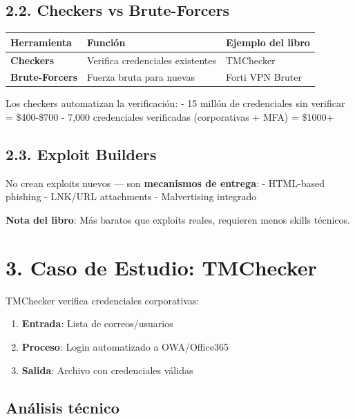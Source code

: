 \documentclass[
  letterpaper,
]{report}
\newcounter{none} %
\providecommand{\tightlist}{%
  \setlength{\itemsep}{0pt}\setlength{\parskip}{0pt}}
\begin{document}
\subsection{2.2. Checkers vs
Brute-Forcers}\label{checkers-vs-brute-forcers}

{\def\LTcaptype{none} %
\begin{longtable}[]{@{}lll@{}}
\toprule\noalign{}
Herramienta & Función & Ejemplo del libro \\
\midrule\noalign{}
\endhead
\bottomrule\noalign{}
\endlastfoot
\textbf{Checkers} & Verifica credenciales existentes & TMChecker \\
\textbf{Brute-Forcers} & Fuerza bruta para nuevas & Forti VPN Bruter \\
\end{longtable}
}

Los checkers automatizan la verificación: - 15 millón de credenciales
sin verificar = \$400-\$700 - 7,000 credenciales verificadas
(corporativas + MFA) = \$1000+

\subsection{2.3. Exploit Builders}\label{exploit-builders}

No crean exploits nuevos --- son \textbf{mecanismos de entrega}: -
HTML-based phishing - LNK/URL attachments - Malvertising integrado

\textbf{Nota del libro}: Más baratos que exploits reales, requieren
menos skills técnicos.

\section{3. Caso de Estudio: TMChecker}\label{caso-de-estudio-tmchecker}

TMChecker verifica credenciales corporativas:

\begin{enumerate}
\def\labelenumi{\arabic{enumi}.}
\tightlist
\item
  \textbf{Entrada}: Lista de correos/usuarios
\item
  \textbf{Proceso}: Login automatizado a OWA/Office365
\item
  \textbf{Salida}: Archivo con credenciales válidas
\end{enumerate}

\subsection{Análisis técnico}\label{anuxe1lisis-tuxe9cnico}
\end{document}
